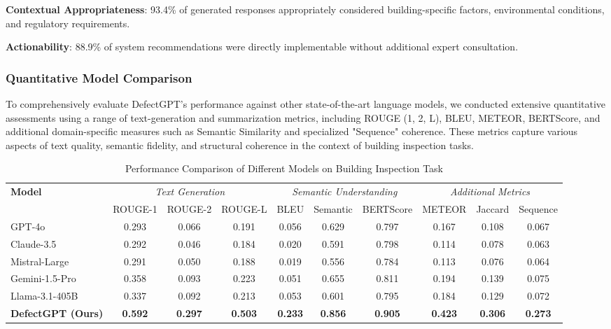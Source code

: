 \textbf{Contextual Appropriateness}: 93.4\% of generated responses appropriately considered building-specific factors, environmental conditions, and regulatory requirements.

\textbf{Actionability}: 88.9\% of system recommendations were directly implementable without additional expert consultation.

\subsubsection{Quantitative Model Comparison}

To comprehensively evaluate DefectGPT's performance against other state-of-the-art language models, we conducted extensive quantitative assessments using a range of text-generation and summarization metrics, including ROUGE (1, 2, L), BLEU, METEOR, BERTScore, and additional domain-specific measures such as Semantic Similarity and specialized "Sequence" coherence. These metrics capture various aspects of text quality, semantic fidelity, and structural coherence in the context of building inspection tasks.

\begin{table}[htbp]
\centering
\caption{Performance Comparison of Different Models on Building Inspection Task}
\label{tab:model-comparison}
\begin{tabular}{l|ccc|ccc|ccc}
\toprule
\multirow{2}{*}{\textbf{Model}} & \multicolumn{3}{c|}{\textit{Text Generation}} & \multicolumn{3}{c|}{\textit{Semantic Understanding}} & \multicolumn{3}{c}{\textit{Additional Metrics}} \\
\cmidrule{2-10}
 & ROUGE-1 & ROUGE-2 & ROUGE-L & BLEU & Semantic & BERTScore & METEOR & Jaccard & Sequence \\
\midrule
GPT-4o & 0.293 & 0.066 & 0.191 & 0.056 & 0.629 & 0.797 & 0.167 & 0.108 & 0.067 \\
Claude-3.5 & 0.292 & 0.046 & 0.184 & 0.020 & 0.591 & 0.798 & 0.114 & 0.078 & 0.063 \\
Mistral-Large & 0.291 & 0.050 & 0.188 & 0.019 & 0.556 & 0.784 & 0.113 & 0.076 & 0.064 \\
Gemini-1.5-Pro & 0.358 & 0.093 & 0.223 & 0.051 & 0.655 & 0.811 & 0.194 & 0.139 & 0.075 \\
Llama-3.1-405B & 0.337 & 0.092 & 0.213 & 0.053 & 0.601 & 0.795 & 0.184 & 0.129 & 0.072 \\
\midrule
\textbf{DefectGPT (Ours)} & \textbf{0.592} & \textbf{0.297} & \textbf{0.503} & \textbf{0.233} & \textbf{0.856} & \textbf{0.905} & \textbf{0.423} & \textbf{0.306} & \textbf{0.273} \\
\bottomrule
\end{tabular}
\end{table}

